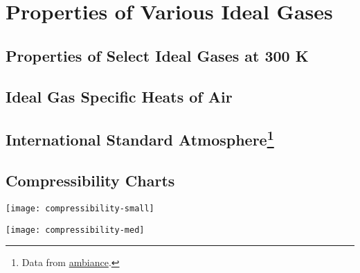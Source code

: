 \chapter{Properties of Various Ideal Gases}
\section{Properties of Select Ideal Gases at 300 K} \label{sec:idealGasProps}

\section[Ideal Gas Specific Heats of Air]{Ideal Gas Specific Heats of Air\footnotemark[1]} \label{sec:idealGasAir}

\section[International Standard Atmosphere]{International Standard Atmosphere\footnote[2]{Data from \href{https://pypi.org/project/ambiance/}{ambiance}.}} \label{app:ISA}


\restoregeometry

\section{Compressibility Charts}
\begin{center}
  \texttt{[image: compressibility-small]}
\end{center}
\begin{center}
  \texttt{[image: compressibility-med]}
\end{center}
\restoregeometry


